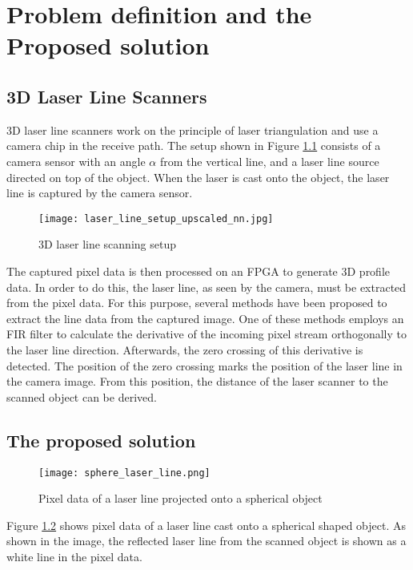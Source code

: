 \chapter{Problem definition and the Proposed solution}

\section{3D Laser Line Scanners}


3D laser line scanners work on the principle of laser triangulation and use a camera chip in the receive path. The setup shown in Figure \ref{fig:laser_line_setup} consists of a camera sensor with an angle $\alpha$ from the vertical line, and a laser line source directed on top of the object. When the laser is cast onto the object, the laser line is captured by the camera sensor.


\begin{figure}[h]
    \centering
    \texttt{[image: laser\_line\_setup\_upscaled\_nn.jpg]}
    \caption{3D laser line scanning setup \cite{method_presentation}}
    \label{fig:laser_line_setup}
\end{figure}


The captured pixel data is then processed on an FPGA to generate 3D profile data. In order to do this, the laser line, as seen by the camera, must be extracted from the pixel data. For this purpose, several methods have been proposed to extract the line data from the captured image. One of these methods employs an FIR filter to calculate the derivative of the incoming pixel stream orthogonally to the laser line direction. Afterwards, the zero crossing of this derivative is detected. The position of the zero crossing marks the position of the laser line in the camera image. From this position, the distance of the laser scanner to the scanned object can be derived.


\section{The proposed solution}


\begin{figure}[h]
    \centering
    \texttt{[image: sphere\_laser\_line.png]}
    \caption{Pixel data of a laser line projected onto a spherical object}
    \label{fig:sphere_laser_line}
\end{figure}


Figure \ref{fig:sphere_laser_line} shows pixel data of a laser line cast onto a spherical shaped object. As shown in the image, the reflected laser line from the scanned object is shown as a white line in the pixel data.

